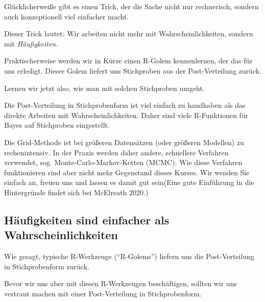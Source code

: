 \documentclass[
  a4paper,
  DIV=11]{scrreprt}
\theoremstyle{definition}
\theoremstyle{remark}
\begin{document}
Glücklicherweiße gibt es einen Trick, der die Sache nicht nur
rechnerisch, sondern auch konzeptionell viel einfacher macht.

Dieser Trick lautet: Wir arbeiten nicht mehr mit Wahrscheinlichkeiten,
sondern mit \emph{Häufigkeiten.}

Praktischerweise werden wir in Kürze einen R-Golem kennenlernen, der das
für uns erledigt. Dieser Golem liefert uns Stichproben aus der
Post-Verteilung zurück.

Lernen wir jetzt also, wie man mit solchen Stichproben umgeht.

\begin{tcolorbox}[enhanced jigsaw, colframe=quarto-callout-important-color-frame, title=\textcolor{quarto-callout-important-color}{\faExclamation}\hspace{0.5em}{Wichtig}, breakable, leftrule=.75mm, coltitle=black, toptitle=1mm, bottomrule=.15mm, bottomtitle=1mm, opacityback=0, arc=.35mm, rightrule=.15mm, left=2mm, colbacktitle=quarto-callout-important-color!10!white, opacitybacktitle=0.6, toprule=.15mm, titlerule=0mm, colback=white]
Die Post-Verteilung in Stichprobenform ist viel einfach zu handhaben als
das direkte Arbeiten mit Wahrscheinlichkeiten. Daher sind viele
R-Funktionen für Bayes auf Stichproben eingestellt.
\end{tcolorbox}

Die Grid-Methode ist bei größeren Datensätzen (oder größeren Modellen)
zu rechenintensiv. In der Praxis werden daher andere, schnellere
Verfahren verwendet, sog. Monte-Carlo-Markov-Ketten (MCMC). Wie diese
Verfahren funktionieren sind aber nicht mehr Gegenstand dieses Kurses.
Wir wenden Sie einfach an, freuen uns und lassen es damit gut sein(Eine
gute Einführung in die Hintergründe findet sich bei McElreath 2020.)

\hypertarget{huxe4ufigkeiten-sind-einfacher-als-wahrscheinlichkeiten}{%
\subsection{Häufigkeiten sind einfacher als
Wahrscheinlichkeiten}\label{huxe4ufigkeiten-sind-einfacher-als-wahrscheinlichkeiten}}

Wie gesagt, typische R-Werkzeuge (``R-Golems'') liefern uns die
Post-Verteilung in Stichprobenform zurück.

Bevor wir uns aber mit diesen R-Werkzeugen beschäftigen, sollten wir uns
vertraut machen mit einer Post-Verteilung in Stichprobenform.
\end{document}
